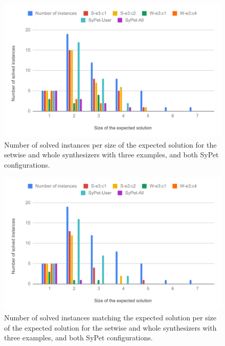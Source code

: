 \begin{figure}
  \centering
  \includegraphics[width=1.0\textwidth]{assets/comparison-solved-sypet-new.pdf}
  \caption{Number of solved instances per size of the expected solution for the
    setwise and whole synthesizers with three examples, and both SyPet
    configurations.}
  \label{fig:comparison-solved-sypet}
\end{figure}

\begin{figure}
  \centering
  \includegraphics[width=1.0\textwidth]{assets/comparison-expected-sypet-new.pdf}
  \caption{Number of solved instances matching the expected solution per size of
    the expected solution for the setwise and whole synthesizers with three
    examples, and both SyPet configurations.}
  \label{fig:comparison-expected-sypet}
\end{figure}
